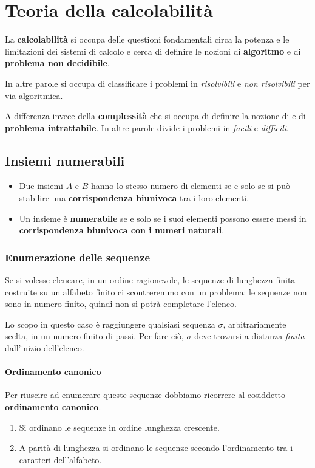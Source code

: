 \chapter{Teoria della calcolabilit\`a}\label{calcolabilita}
La \textbf{calcolabilit\`a} si occupa delle questioni fondamentali circa la potenza e le limitazioni dei sistemi di
calcolo e cerca di definire le nozioni di \textbf{algoritmo} e di \textbf{problema non decidibile}.

In altre parole si occupa di classificare i problemi in \emph{risolvibili} e \emph{non risolvibili} per via algoritmica.

A differenza invece della \textbf{complessit\`a} che si occupa di definire la nozione di 
e di \textbf{problema intrattabile}.  In altre parole divide i problemi in \emph{facili} e \emph{difficili}.

\section{Insiemi numerabili}\label{insiemi_numerabili}
\begin{itemize}
	\item Due insiemi $A$ e $B$ hanno lo stesso numero di elementi se e solo se si pu\`o stabilire una
	      \textbf{corrispondenza biunivoca} tra i loro elementi.
	\item Un insieme \`e \textbf{numerabile} se e solo se i suoi elementi possono essere messi in
	      \textbf{corrispondenza biunivoca con i numeri naturali}.
\end{itemize}

\subsection{Enumerazione delle sequenze}
Se si volesse elencare, in un ordine ragionevole, le sequenze di lunghezza finita costruite su un alfabeto finito ci
scontreremmo con un problema: le sequenze non sono in numero finito, quindi non si potr\`a completare l'elenco.

Lo scopo in questo caso \`e raggiungere qualsiasi sequenza $\sigma$, arbitrariamente scelta, in un numero finito di passi.
Per fare ci\`o, $\sigma$ deve trovarsi a distanza \emph{finita} dall'inizio dell'elenco.

\subsubsection{Ordinamento canonico}
Per riuscire ad enumerare queste sequenze dobbiamo ricorrere al cosiddetto \textbf{ordinamento canonico}.
\begin{enumerate}
	\item Si ordinano le sequenze in ordine lunghezza crescente.
	\item A parit\`a di lunghezza si ordinano le sequenze secondo l'ordinamento tra i caratteri dell'alfabeto.
\end{enumerate}

